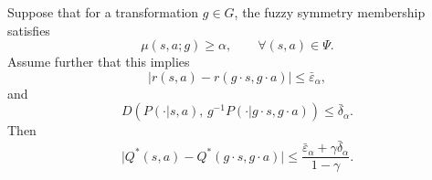 \begin{theorem}
Suppose that for a transformation $g \in G$, the fuzzy symmetry membership satisfies
\begin{equation}
\mu(s,a;g)\ge \alpha,\qquad \forall (s,a)\in\Psi.
\end{equation}
Assume further that this implies
\begin{equation}
|r(s,a)-r(g\!\cdot\! s,g\!\cdot\! a)|\le \bar{\varepsilon}_\alpha,
\end{equation}
and
\begin{equation}
D\!\left(P(\cdot|s,a),\,g^{-1}P(\cdot|g\!\cdot\! s,g\!\cdot\! a)\right)\le \bar{\delta}_\alpha.
\end{equation}
Then
\begin{equation}
\big|Q^*(s,a)-Q^*(g\!\cdot\! s,g\!\cdot\! a)\big|
\le
\frac{\bar{\varepsilon}_\alpha+\gamma \bar{\delta}_\alpha}{1-\gamma}.
\end{equation}
\end{theorem}
